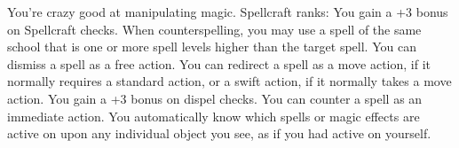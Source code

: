 \skillfeat
{You're crazy good at manipulating magic.}
{Spellcraft ranks:}
{You gain a +3 bonus on Spellcraft checks.}
{When counterspelling, you may use a spell of the same school that is one or more spell levels higher than the target spell.}
{You can dismiss a spell as a free action. You can redirect a spell as a move action, if it normally requires a standard action, or a swift action, if it normally takes a move action. You gain a +3 bonus on dispel checks.}
{You can counter a spell as an immediate action.}
{You automatically know which spells or magic effects are active on upon any individual object you see, as if you had  active on yourself.}